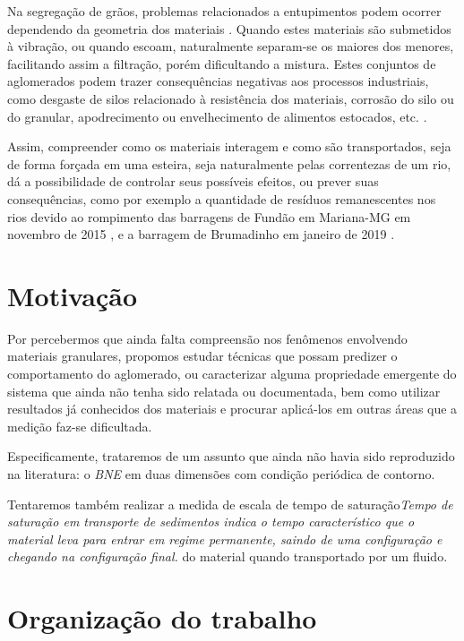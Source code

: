     Na segregação de grãos, problemas relacionados a entupimentos podem ocorrer dependendo da geometria dos materiais \cite{Caio-Tese}. Quando estes materiais são submetidos à vibração, ou quando escoam, naturalmente separam-se os maiores dos menores, facilitando assim a filtração, porém dificultando a mistura. Estes conjuntos de aglomerados podem trazer consequências negativas aos processos industriais, como desgaste de silos relacionado à resistência dos materiais, corrosão do silo ou do granular, apodrecimento ou envelhecimento de alimentos estocados, etc. \cite{Silo_failures}.

    Assim, compreender como os materiais interagem e como são transportados, seja de forma forçada em uma esteira, seja naturalmente pelas correntezas de um rio, dá a possibilidade de controlar seus possíveis efeitos, ou prever suas consequências, como por exemplo a quantidade de resíduos remanescentes nos rios devido ao rompimento das barragens de Fundão em Mariana-MG em novembro de 2015 \cite{Mariana_en, Mariana_pt, Mariana_fr}, e a barragem de Brumadinho em janeiro de 2019 \cite{Brumadinho_en, Brumadinho_pt, Brumadinho_fr}.

\section{Motivação}
\label{sec:motivacao}

    Por percebermos que ainda falta compreensão nos fenômenos envolvendo materiais granulares, propomos estudar técnicas que possam predizer o comportamento do aglomerado, ou caracterizar alguma propriedade emergente do sistema que ainda não tenha sido relatada ou documentada, bem como utilizar resultados já conhecidos dos materiais e procurar aplicá-los em outras áreas que a medição faz-se dificultada.
    
    Especificamente, trataremos de um assunto que ainda não havia sido reproduzido na literatura: o \textit{BNE} em duas dimensões com condição periódica de contorno.

    Tentaremos também realizar a medida de escala de tempo de saturação\textit{Tempo de saturação em transporte de sedimentos indica o tempo característico que o material leva para entrar em regime permanente, saindo de uma configuração e chegando na configuração final.} do material quando transportado por um fluido.

\section{Organização do trabalho}
\label{sec:organizacaoTrabalho}

